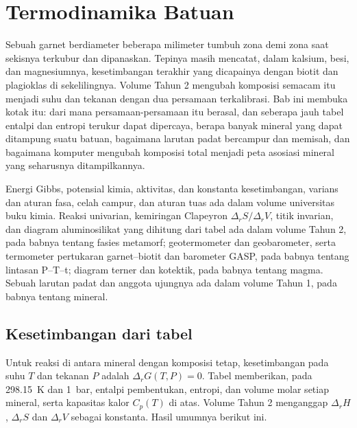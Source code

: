 \chapter{Termodinamika Batuan}\label{ch:b3:petrological-thermodynamics}

Sebuah garnet berdiameter beberapa milimeter tumbuh zona demi zona saat sekisnya terkubur
dan dipanaskan. Tepinya masih mencatat, dalam kalsium, besi, dan magnesiumnya,
kesetimbangan terakhir yang dicapainya dengan biotit dan plagioklas di sekelilingnya.
Volume Tahun 2 mengubah komposisi semacam itu menjadi suhu dan tekanan dengan
dua persamaan terkalibrasi. Bab ini membuka kotak itu: dari mana persamaan-persamaan itu berasal,
dan seberapa jauh tabel entalpi dan entropi terukur dapat
dipercaya, berapa banyak mineral yang dapat ditampung suatu batuan, bagaimana larutan padat bercampur dan
memisah, dan bagaimana komputer mengubah komposisi total menjadi peta
asosiasi mineral yang seharusnya ditampilkannya.

\begin{recall}
Energi Gibbs, potensial kimia, aktivitas, dan konstanta kesetimbangan,
varians dan aturan fasa, celah campur, dan aturan tuas
ada dalam volume universitas buku kimia. Reaksi univarian,
kemiringan Clapeyron $\Delta_rS/\Delta_rV$, titik invarian, dan
diagram aluminosilikat yang dihitung dari tabel ada dalam volume Tahun 2, pada babnya
tentang fasies metamorf; geotermometer dan geobarometer, serta
termometer pertukaran garnet--biotit dan barometer GASP, pada babnya tentang
lintasan P--T--t; diagram terner dan kotektik, pada babnya tentang magma. Sebuah
larutan padat dan anggota ujungnya ada dalam volume Tahun 1, pada babnya tentang
mineral.
\end{recall}

\section{Kesetimbangan dari tabel}\label{sec:b3:petrological-thermodynamics:tables}

Untuk reaksi di antara mineral dengan komposisi tetap, kesetimbangan pada
suhu $T$ dan tekanan $P$ adalah $\Delta_rG(T, P) = 0$. Tabel memberikan, pada
\qty{298.15}{K} dan \qty{1}{bar}, entalpi pembentukan, entropi, dan
volume molar setiap mineral, serta kapasitas kalor $C_p(T)$ di atas.
Volume Tahun 2 menganggap $\Delta_rH$, $\Delta_rS$ dan $\Delta_rV$ sebagai konstanta. Hasil
umumnya berikut ini.

